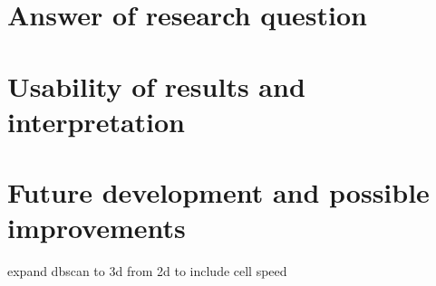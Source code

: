 \documentclass[a4paper,12pt]{report}
\begin{document}
\section{Answer of research question}

\section{Usability of results and interpretation}

\section{Future development and possible improvements} 

expand dbscan to 3d from 2d to include cell speed



{}

\listoffigures

\listoftables

\printglossary[title=List of Acronyms, type=\acronymtype]

\printglossary[title=List of Terms]
\end{document}
